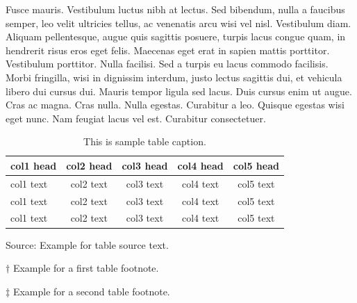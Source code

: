\documentclass[AMS,STIX2COL]{WileyNJD-v2}
\begin{document}
    Fusce mauris. Vestibulum luctus nibh at lectus. Sed bibendum, nulla a faucibus semper, leo velit ultricies tellus, ac
    venenatis arcu wisi vel nisl. Vestibulum diam. Aliquam pellentesque, augue quis sagittis posuere, turpis lacus congue
    quam, in hendrerit risus eros eget felis. Maecenas eget erat in sapien mattis porttitor. Vestibulum porttitor. Nulla
    facilisi. Sed a turpis eu lacus commodo facilisis. Morbi fringilla, wisi in dignissim interdum, justo lectus sagittis dui, et
    vehicula libero dui cursus dui. Mauris tempor ligula sed lacus. Duis cursus enim ut augue. Cras ac magna. Cras nulla.
    Nulla egestas. Curabitur a leo. Quisque egestas wisi eget nunc. Nam feugiat lacus vel est. Curabitur consectetuer.



    \begin{center}
        \begin{table}[t]%
            \centering
            \caption{This is sample table caption.\label{tab2}}%
            \begin{tabular*}{500pt}{@{\extracolsep\fill}lcccc@{\extracolsep\fill}}
                \toprule
                \textbf{col1 head} & \textbf{col2 head} & \textbf{col3 head} & \textbf{col4 head} & \textbf{col5 head}          \\
                \midrule
                col1 text          & col2 text          & col3 text          & col4 text          & col5 text\tnote{$\dagger$}  \\
                col1 text          & col2 text          & col3 text          & col4 text          & col5 text                   \\
                col1 text          & col2 text          & col3 text          & col4 text          & col5 text\tnote{$\ddagger$} \\
                \bottomrule
            \end{tabular*}
            \begin{tablenotes}
                \item Source: Example for table source text.
                \item[$\dagger$] Example for a first table footnote.
                \item[$\ddagger$] Example for a second table footnote.
            \end{tablenotes}
        \end{table}
    \end{center}
\end{document}
